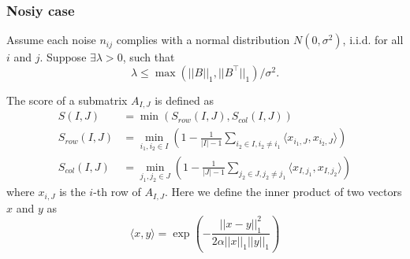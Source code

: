 \subsubsection{Nosiy case}
Assume each noise $n_{ij}$ complies with a normal distribution $N(0, \sigma^2)$, i.i.d. for all $i$ and $j$. Suppose $\exists \lambda > 0$, such that
$$\lambda \le \max(||B||_1, ||B^\top||_1)/\sigma^2.$$

The score of a submatrix $A_{I,J}$ is defined as
\begin{align}
    S(I,J)       & = \min(S_{row}(I,J), S_{col}(I,J))                                                                                          \\
    S_{row}(I,J) & = \min_{i_1, i_2 \in I} \left(1- \frac{1}{|I|-1} \sum_{i_2 \in I, i_2 \neq i_1} \langle x_{i_1,J}, x_{i_2,J}\rangle \right) \\
    S_{col}(I,J) & = \min_{j_1, j_2 \in J} \left(1- \frac{1}{|J|-1} \sum_{j_2 \in J, j_2 \neq j_1} \langle x_{I,j_1}, x_{I,j_2}\rangle \right)
\end{align}
where $x_{i,J}$ is the $i$-th row of $A_{I,J}$. Here we define the inner product of two vectors $x$ and $y$ as
$$\langle x, y \rangle = \exp(-\frac{||x - y||_1^2}{2\alpha||x||_1||y||_1})$$

